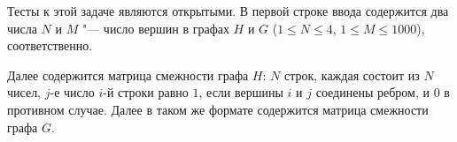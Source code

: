 Тесты к этой задаче являются открытыми.
В первой строке ввода содержится два числа $N$ и $M$ "--- число вершин
в графах $H$ и $G$ ($1 \le N \le 4$, $1 \le M \le 1000$), соответственно.

Далее содержится матрица смежности графа $H$: $N$ строк,
каждая состоит из $N$ чисел, $j$-е число $i$-й строки равно $1$,
если вершины $i$ и $j$ соединены ребром, и $0$ в противном случае.
Далее в таком же формате содержится матрица смежности графа $G$.
